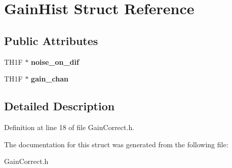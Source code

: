 \section{Gain\-Hist Struct Reference}
\label{structGainHist}
\subsection*{Public Attributes}
\begin{DoxyCompactItemize}
\item 
T\-H1\-F $\ast$ {\bfseries noise\-\_\-on\-\_\-dif}\label{structGainHist_a3f4b2c4b6da381be1639bcf91e1b09ec}

\item 
T\-H1\-F $\ast$ {\bfseries gain\-\_\-chan}\label{structGainHist_a672b31f0e7a6fd8aeb98e22d810018a1}

\end{DoxyCompactItemize}


\subsection{Detailed Description}


Definition at line 18 of file Gain\-Correct.\-h.



The documentation for this struct was generated from the following file\-:\begin{DoxyCompactItemize}
\item 
Gain\-Correct.\-h\end{DoxyCompactItemize}
